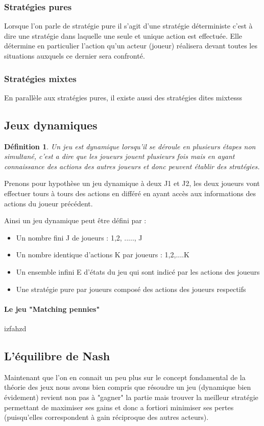 \documentclass[a4paper, 12pt, twoside]{article}
\newtheorem{definition}{Définition}
\begin{document}
\subsubsection{Stratégies pures}
Lorsque l'on parle de stratégie pure il s'agit d'une stratégie déterministe c'est à dire une stratégie dans laquelle une seule et unique action est effectuée. Elle détermine en particulier l'action qu'un acteur (joueur) réalisera devant toutes les situations auxquels ce dernier sera confronté. 
\subsubsection{Stratégies mixtes}
En parallèle aux stratégies pures, il existe aussi des stratégies dites mixtesss
\subsection{Jeux dynamiques}
\begin{definition}
Un jeu est dynamique lorsqu'il se déroule en plusieurs étapes non simultané, c'est a dire que les joueurs jouent plusieurs fois mais en ayant connaissance des actions des autres joueurs et donc peuvent établir des stratégies.
\end{definition}

Prenons pour hypothèse un jeu dynamique à deux  J1 et J2, les deux joueurs vont effectuer tours à tours des actions en différé en ayant accès aux informations des actions du joueur précédent. \newline

Ainsi un \textsf{jeu dynamique} peut être défini par : 
\begin{itemize}
\item Un nombre fini J de joueurs : {1,2, ....., J}
\item Un nombre identique d'actions K par joueurs : {1,2,....K}  
\item Un ensemble infini E d'états du jeu qui sont indicé par les actions des joueurs 
\item Une stratégie pure par joueurs composé des actions des joueurs respectifs
\end{itemize}



\paragraph{Le jeu "Matching pennies"}{izfahzd}


\subsection{L'équilibre de Nash}
Maintenant que l'on en connait un peu plus sur le concept fondamental de la \textsf{théorie des jeux} nous avons bien compris que résoudre un jeu (dynamique bien évidement) revient non pas à "gagner" la partie mais trouver la meilleur stratégie permettant de maximiser ses gains et donc a fortiori minimiser ses pertes (puisqu'elles correspondent à gain réciproque des autres acteurs). \newline
\end{document}
